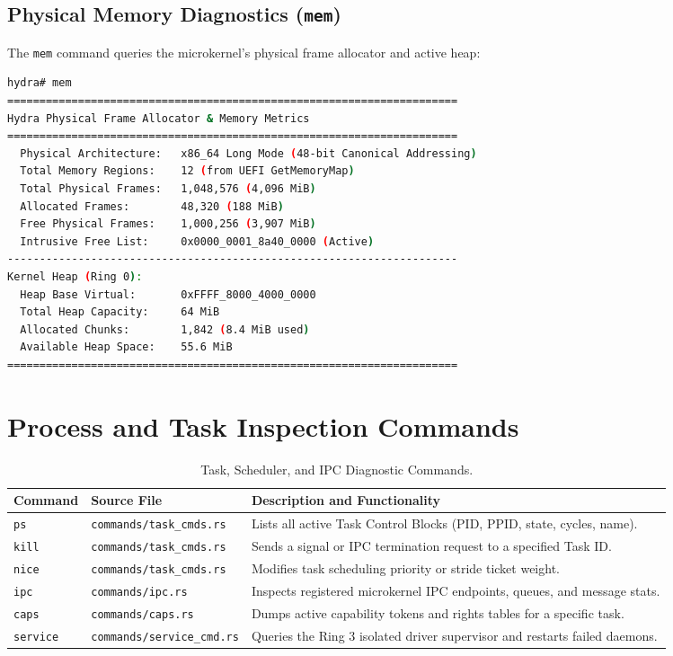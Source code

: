 \subsection{Physical Memory Diagnostics (\texttt{mem})}
The \texttt{mem} command queries the microkernel's physical frame allocator and active heap:
\begin{lstlisting}[language=bash]
hydra# mem
======================================================================
Hydra Physical Frame Allocator & Memory Metrics
======================================================================
  Physical Architecture:   x86_64 Long Mode (48-bit Canonical Addressing)
  Total Memory Regions:    12 (from UEFI GetMemoryMap)
  Total Physical Frames:   1,048,576 (4,096 MiB)
  Allocated Frames:        48,320 (188 MiB)
  Free Physical Frames:    1,000,256 (3,907 MiB)
  Intrusive Free List:     0x0000_0001_8a40_0000 (Active)
----------------------------------------------------------------------
Kernel Heap (Ring 0):
  Heap Base Virtual:       0xFFFF_8000_4000_0000
  Total Heap Capacity:     64 MiB
  Allocated Chunks:        1,842 (8.4 MiB used)
  Available Heap Space:    55.6 MiB
======================================================================
\end{lstlisting}

\section{Process and Task Inspection Commands}
\label{sec:shell_task_cmds}

\begin{table}[htbp]
\centering
\small
\begin{tabularx}{\textwidth}{llX}
\toprule
\textbf{Command} & \textbf{Source File} & \textbf{Description and Functionality} \\
\midrule
\texttt{ps} & \texttt{commands/task\_cmds.rs} & Lists all active Task Control Blocks (PID, PPID, state, cycles, name). \\
\texttt{kill} & \texttt{commands/task\_cmds.rs} & Sends a signal or IPC termination request to a specified Task ID. \\
\texttt{nice} & \texttt{commands/task\_cmds.rs} & Modifies task scheduling priority or stride ticket weight. \\
\texttt{ipc} & \texttt{commands/ipc.rs} & Inspects registered microkernel IPC endpoints, queues, and message stats. \\
\texttt{caps} & \texttt{commands/caps.rs} & Dumps active capability tokens and rights tables for a specific task. \\
\texttt{service} & \texttt{commands/service\_cmd.rs} & Queries the Ring 3 isolated driver supervisor and restarts failed daemons. \\
\bottomrule
\end{tabularx}
\caption{Task, Scheduler, and IPC Diagnostic Commands.}
\label{tab:shell_task_cmds}
\end{table}

